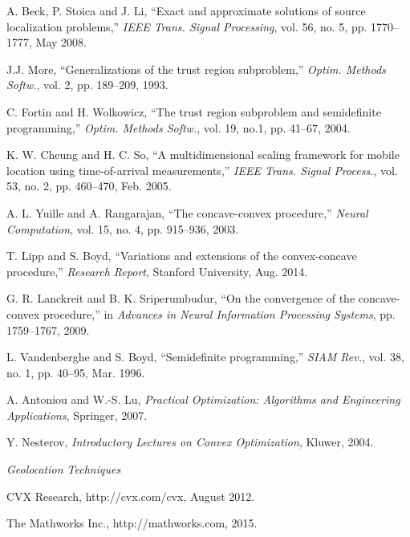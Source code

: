 \begin{thebibliography}{99}
A. Beck, P. Stoica and J. Li,  ``Exact and approximate solutions of source localization problems,'' {\em
IEEE Trans. Signal Processing}, vol. 56, no. 5, pp. 1770--1777, May
2008.

J.J. More, ``Generalizations of the trust region subproblem,'' {\em Optim. Methods Softw.}, vol. 2, pp. 189--209, 1993.

C. Fortin and H. Wolkowicz, ``The trust region subproblem and semidefinite programming,'' {\em Optim. Methods Softw.}, vol. 19, no.1, pp. 41--67, 2004.

K. W. Cheung and H. C. So, ``A multidimensional scaling framework for mobile location using time-of-arrival measurements,'' {\em IEEE Trans. Signal Process.}, vol. 53, no. 2, pp. 460–470, Feb. 2005.

A. L. Yuille and A. Rangarajan, ``The concave-convex procedure,'' {\em Neural Computation}, vol. 15, no. 4, pp. 915--936, 2003.

T. Lipp and S. Boyd, ``Variations and extensions of the convex-concave procedure,'' {\em Research Report}, Stanford University, Aug. 2014.

G. R. Lanckreit and B. K. Sriperumbudur, ``On the convergence of the concave-convex procedure,'' in  {\em Advances in Neural Information Processing Systems}, pp. 1759--1767, 2009.

L. Vandenberghe and S. Boyd, ``Semidefinite programming,'' {\em SIAM Rev.}, vol. 38, no. 1, pp. 40--95, Mar. 1996.

A. Antoniou and W.-S. Lu, {\em Practical Optimization: Algorithms and Engineering Applications}, Springer, 2007.

Y. Nesterov, {\em Introductory Lectures on Convex Optimization}, Kluwer, 2004.

{\em Geolocation Techniques}

CVX Research, http://cvx.com/cvx, August 2012.

The Mathworks Inc., http://mathworks.com, 2015.

\end{thebibliography}
